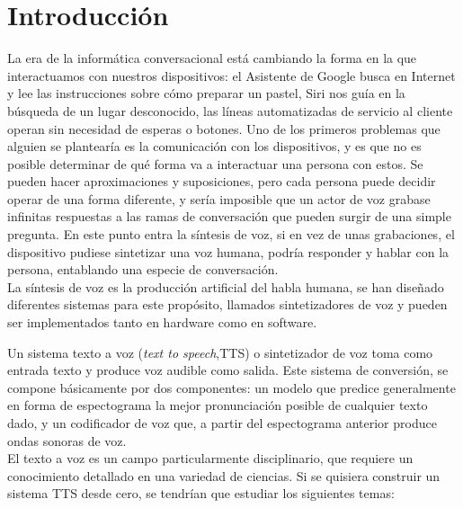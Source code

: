 \chapter*{Introducción}\label{chapter:introduction}

La era de la informática conversacional está cambiando la forma en la que interactuamos con nuestros dispositivos: el Asistente de Google busca en Internet y lee las instrucciones sobre cómo preparar un pastel, Siri nos guía en la búsqueda de un lugar desconocido, las líneas automatizadas de servicio al cliente operan sin necesidad de esperas o botones. Uno de los primeros problemas que alguien se plantearía es la comunicación con los dispositivos, y es que no es posible determinar de qué forma va a
interactuar una persona con estos. Se pueden hacer aproximaciones y suposiciones, pero cada persona puede decidir operar de una forma diferente, y sería imposible que un actor de voz grabase infinitas respuestas a las ramas de conversación que pueden surgir de una simple pregunta. En este punto entra la síntesis de voz, si en vez de unas grabaciones, el dispositivo pudiese sintetizar una voz humana, podría responder y hablar con la persona, entablando una especie de conversación.\\



La síntesis de voz es la producción artificial del habla humana, se han diseñado diferentes sistemas para este propósito, llamados sintetizadores de voz y pueden ser implementados tanto en hardware como en software. 

Un sistema texto a voz (\textit{text to speech},TTS) o sintetizador de voz toma como entrada texto y produce voz audible como salida. Este sistema de conversión, se compone básicamente por dos componentes: un modelo que predice generalmente en forma de espectograma la mejor pronunciación posible de cualquier texto dado, y un codificador de voz que, a partir del espectograma anterior produce ondas sonoras de voz.\\

El texto a voz es un campo particularmente disciplinario, que requiere un conocimiento
detallado en una variedad de ciencias. Si se quisiera construir un sistema TTS desde cero, se tendrían que estudiar los siguientes temas:

